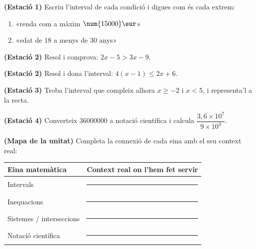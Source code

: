\begin{exercicis}
\begin{exlist}
  \item \textbf{(Estació 1)} Escriu l'interval de cada condició i digues com és cada
        extrem:
        \begin{enumerate}[label=\alph*), leftmargin=1.6em, topsep=2pt]
          \item «renda com a màxim $\num{15000}\eur$»
          \item «edat de $18$ a menys de $30$ anys»
        \end{enumerate}
  \item \textbf{(Estació 2)} Resol i comprova: $2x-5>3x-9$.
  \item \textbf{(Estació 2)} Resol i dona l'interval: $4(x-1)\le 2x+6$.
  \item \textbf{(Estació 3)} Troba l'interval que compleix alhora $x\ge -2$ i $x<5$,
        i representa'l a la recta.
  \item \textbf{(Estació 4)} Converteix $\num{36000000}$ a notació científica i
        calcula $\dfrac{3,6\times 10^{7}}{9\times 10^{3}}$.
  \item \textbf{(Mapa de la unitat)} Completa la connexió de cada eina amb el seu
        context real:
        \begin{center}
        \renewcommand{\arraystretch}{1.4}
        \begin{tabular}{p{4.6cm} p{8cm}}
        \toprule
        \textbf{Eina matemàtica} & \textbf{Context real on l'hem fet servir} \\
        \midrule
        Intervals & \rule{7.4cm}{0.4pt} \\
        Inequacions & \rule{7.4cm}{0.4pt} \\
        Sistemes / interseccions & \rule{7.4cm}{0.4pt} \\
        Notació científica & \rule{7.4cm}{0.4pt} \\
        \bottomrule
        \end{tabular}
        \end{center}
\end{exlist}
\end{exercicis}

